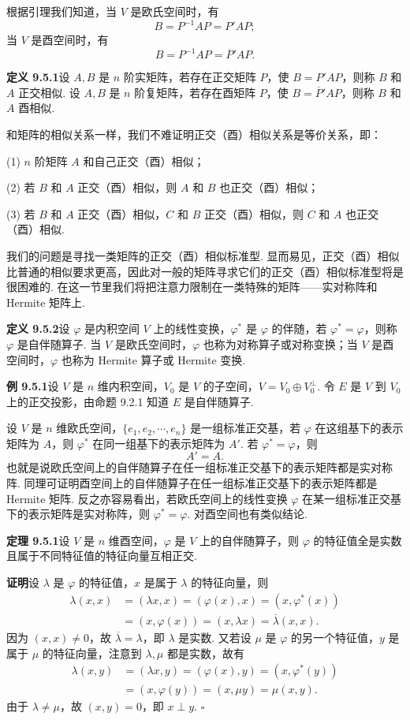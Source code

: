 \documentclass[UTF8,12pt,a4paper,fontset=fandol]{ctexart}
\begin{document}
根据引理我们知道，当 $V$ 是欧氏空间时，有
\[
  B=P^{-1}AP=P'AP;
\]
当 $V$ 是酉空间时，有
\[
  B=P^{-1}AP=\overline P'AP.
\]

\noindent\textbf{定义 9.5.1}\quad 设 $A,B$ 是 $n$ 阶实矩阵，若存在正交矩阵 $P$，使 $B=P'AP$，则称 $B$ 和 $A$ 正交相似. 设 $A,B$ 是 $n$ 阶复矩阵，若存在酉矩阵 $P$，使 $B=\overline P'AP$，则称 $B$ 和 $A$ 酉相似.

和矩阵的相似关系一样，我们不难证明正交（酉）相似关系是等价关系，即：

(1) $n$ 阶矩阵 $A$ 和自己正交（酉）相似；

(2) 若 $B$ 和 $A$ 正交（酉）相似，则 $A$ 和 $B$ 也正交（酉）相似；

(3) 若 $B$ 和 $A$ 正交（酉）相似，$C$ 和 $B$ 正交（酉）相似，则 $C$ 和 $A$ 也正交（酉）相似.

我们的问题是寻找一类矩阵的正交（酉）相似标准型. 显而易见，正交（酉）相似比普通的相似要求更高，因此对一般的矩阵寻求它们的正交（酉）相似标准型将是很困难的. 在这一节里我们将把注意力限制在一类特殊的矩阵——实对称阵和 Hermite 矩阵上.

\noindent\textbf{定义 9.5.2}\quad 设 $\varphi$ 是内积空间 $V$ 上的线性变换，$\varphi^*$ 是 $\varphi$ 的伴随，若 $\varphi^*=\varphi$，则称 $\varphi$ 是自伴随算子. 当 $V$ 是欧氏空间时，$\varphi$ 也称为对称算子或对称变换；当 $V$ 是酉空间时，$\varphi$ 也称为 Hermite 算子或 Hermite 变换.

\noindent\textbf{例 9.5.1}\quad 设 $V$ 是 $n$ 维内积空间，$V_0$ 是 $V$ 的子空间，$V=V_0\oplus V_0^\perp$. 令 $E$ 是 $V$ 到 $V_0$ 上的正交投影，由命题 9.2.1 知道 $E$ 是自伴随算子.

设 $V$ 是 $n$ 维欧氏空间，$\{e_1,e_2,\cdots,e_n\}$ 是一组标准正交基，若 $\varphi$ 在这组基下的表示矩阵为 $A$，则 $\varphi^*$ 在同一组基下的表示矩阵为 $A'$. 若 $\varphi^*=\varphi$，则
\[
  A'=A.
\]
也就是说欧氏空间上的自伴随算子在任一组标准正交基下的表示矩阵都是实对称阵. 同理可证明酉空间上的自伴随算子在任一组标准正交基下的表示矩阵都是 Hermite 矩阵. 反之亦容易看出，若欧氏空间上的线性变换 $\varphi$ 在某一组标准正交基下的表示矩阵是实对称阵，则 $\varphi^*=\varphi$. 对酉空间也有类似结论.

\noindent\textbf{定理 9.5.1}\quad 设 $V$ 是 $n$ 维酉空间，$\varphi$ 是 $V$ 上的自伴随算子，则 $\varphi$ 的特征值全是实数且属于不同特征值的特征向量互相正交.

\noindent\textbf{证明}\quad 设 $\lambda$ 是 $\varphi$ 的特征值，$x$ 是属于 $\lambda$ 的特征向量，则
\[
\begin{aligned}
  \lambda(x,x)
  &=(\lambda x,x)=(\varphi(x),x)=(x,\varphi^*(x))\\
  &=(x,\varphi(x))=(x,\lambda x)=\overline\lambda(x,x).
\end{aligned}
\]
因为 $(x,x)\ne0$，故 $\overline\lambda=\lambda$，即 $\lambda$ 是实数. 又若设 $\mu$ 是 $\varphi$ 的另一个特征值，$y$ 是属于 $\mu$ 的特征向量，注意到 $\lambda,\mu$ 都是实数，故有
\[
\begin{aligned}
  \lambda(x,y)
  &=(\lambda x,y)=(\varphi(x),y)=(x,\varphi^*(y))\\
  &=(x,\varphi(y))=(x,\mu y)=\mu(x,y).
\end{aligned}
\]
由于 $\lambda\ne\mu$，故 $(x,y)=0$，即 $x\perp y$. $\square$
\end{document}
